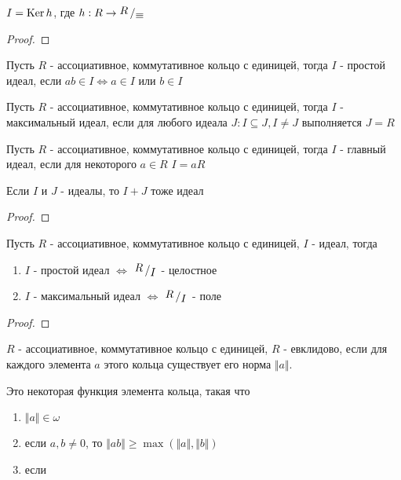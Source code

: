 \documentclass[../main/document.tex]{subfiles}
\begin{document}
\begin{cnsq}
$I=\operatorname{Ker} h$, где $h:R\to\bigslant{R}{\equiv} $
\begin{proof}

\end{proof}
\end{cnsq}
\begin{dfn}
Пусть $R$ - ассоциативное, коммутативное кольцо с единицей, тогда $I$ - простой идеал, если $ab\in I\Leftrightarrow a\in I$ или $b\in I$
\end{dfn}
\begin{dfn}
Пусть $R$ - ассоциативное, коммутативное кольцо с единицей, тогда $I$ - максимальный идеал, если для любого идеала $J: I\subseteq J, I\neq J$ выполняется $J=R$
\end{dfn}
\begin{dfn}
Пусть $R$ - ассоциативное, коммутативное кольцо с единицей, тогда $I$ - главный идеал, если для некоторого $a\in R$ $I=aR$
\end{dfn}
\begin{exm}[??????]

\end{exm}
\begin{lemma}
Если $I$ и $J$ - идеалы, то $I+J$ тоже идеал
\begin{proof}

\end{proof}
\end{lemma}
\begin{thm}
Пусть $R$ - ассоциативное, коммутативное кольцо с единицей, $I$ - идеал, тогда
\begin{enumerate}
\item $I$ - простой идеал $\Leftrightarrow$ $\bigslant{R}{I}$ - целостное
\item $I$ - максимальный идеал $\Leftrightarrow$ $\bigslant{R}{I}$ - поле
\end{enumerate}
\begin{proof}

\end{proof}
\end{thm}
\begin{dfn}
$R$ - ассоциативное, коммутативное кольцо с единицей, $R$ - евклидово, если для каждого элемента $a$ этого кольца существует его норма $\Vert a\Vert$.
\end{dfn}
\begin{dfn}
Это некоторая функция элемента кольца, такая что
\begin{enumerate}
\item $\Vert a\Vert \in \omega$
\item если $a,b\neq 0$, то $\Vert ab\Vert \geq \max(\Vert a\Vert,\Vert b\Vert)$
\item если $$
\end{enumerate}
\end{dfn}
\end{document}
